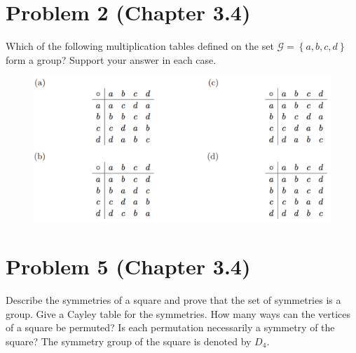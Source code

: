 \documentclass[cm, 10pt]{article}
\newcommand{\set}[1]{\ensuremath{ \left\{ #1 \right\} }}
\begin{document}

    \section*{Problem 2 (Chapter 3.4)}
      Which of the following multiplication tables defined on the set
      $\mathcal{G} = \set{a,b,c,d}$ form a group? Support your answer
      in each case.
      \begin{figure}[h!]
        \centering
        \includegraphics[width=.6\linewidth]{fig1.png}
      \end{figure}

    \hrulefill %

    \clearpage %


    \section*{Problem 5 (Chapter 3.4)}
      Describe the symmetries of a square and prove that the set of
      symmetries is a group. Give a Cayley table for the symmetries.
      How many ways can the vertices of a square be permuted? Is each
      permutation necessarily a symmetry of the square? The symmetry
      group of the square is denoted by $D_4$.

    \hrulefill %

    \clearpage

\end{document}
